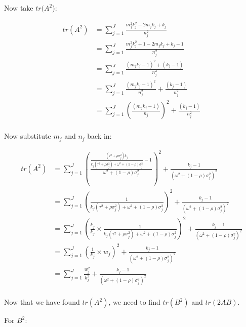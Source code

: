 Now take $tr(A^2$):

\begin{equation}
    \begin{split}
        tr(A^2) & = \sum_{j=1}^J \frac{m_j^2 k_j^2 - 2m_jk_j + k_j}{n_j^2} \\
                & = \sum_{j=1}^J \frac{m_j^2 k_j^2 +1 - 2m_jk_j + k_j -1}{n_j^2} \\
                & = \sum_{j=1}^J \frac{(m_jk_j-1)^2+(k_j-1)}{n_j^2} \\
                & = \sum_{j=1}^J \frac{(m_jk_j-1)^2}{n_j^2} + \frac{(k_j-1)}{n_j^2} \\
                & = \sum_{j=1}^J \left(\frac{(m_jk_j-1)}{n_j}\right)^2 + \frac{(k_j-1)}{n_j^2} \\
    \end{split}
    \nonumber
\end{equation}


Now substitute $m_j$ and $n_j$ back in:

\begin{equation}
    \begin{split}
         tr(A^2) & = \sum_{j=1}^J\left( \frac{\frac{(\tau^2 +\rho\sigma_j^2)k_j}{k_j(\tau^2 + \rho\sigma^2_j)+\omega^2+(1-\rho)\sigma_j^2}- 1}{\omega^2 + (1 - \rho)\sigma_j^2} \right)^2 + \frac{k_j-1}{(\omega^2 + (1 - \rho)\sigma_j^2)^2} \\
       & = \sum_{j=1}^J\left( \frac{1}{k_j(\tau^2 + \rho\sigma^2_j)+\omega^2+(1-\rho)\sigma_j^2} \right)^2 + \frac{k_j-1}{(\omega^2 + (1 - \rho)\sigma_j^2)^2} \\
       & = \sum_{j=1}^J\left( \frac{k_j}{k_j} \times \frac{1}{k_j(\tau^2 + \rho\sigma^2_j)+\omega^2+(1-\rho)\sigma_j^2} \right)^2 + \frac{k_j-1}{(\omega^2 + (1 - \rho)\sigma_j^2)^2} \\
       & = \sum_{j=1}^J\left( \frac{1}{k_j} \times w_j \right)^2 + \frac{k_j-1}{(\omega^2 + (1 - \rho)\sigma_j^2)^2} \\
       & = \sum_{j=1}^J\frac{w_j^2}{k_j^2}  + \frac{k_j-1}{(\omega^2 + (1 - \rho)\sigma_j^2)^2} \\
    \end{split}
    \nonumber
\end{equation}

Now that we have found $tr(A^2)$, we need to find $tr(B^2)$ and $tr(2AB)$. 

For $B^2$:

